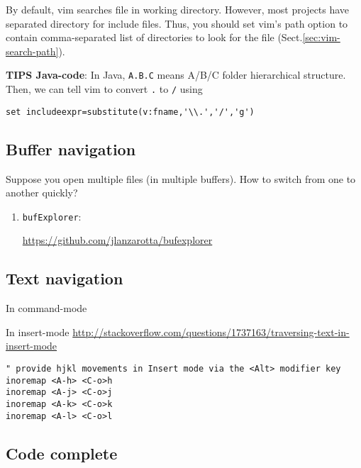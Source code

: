 By default, vim searches file in working directory. 
However, most projects have separated directory for include files. Thus, you
should set vim's path option to contain comma-separated list of directories to
look for the file (Sect.\ref{sec:vim-search-path}).

{\bf TIPS Java-code}: In Java, \verb!A.B.C! means A/B/C folder hierarchical
structure. Then, we can tell vim to convert \verb!.! to \verb!/! using
\begin{verbatim}
set includeexpr=substitute(v:fname,'\\.','/','g')
\end{verbatim}

\subsection{Buffer navigation}

Suppose you open multiple files (in multiple buffers). How to switch from one to
another quickly?

\begin{enumerate}
  \item \verb!bufExplorer!:
  
  \url{https://github.com/jlanzarotta/bufexplorer}
  
  
  
\end{enumerate}

\subsection{Text navigation}

In command-mode



In insert-mode
\url{http://stackoverflow.com/questions/1737163/traversing-text-in-insert-mode}

\begin{verbatim}
" provide hjkl movements in Insert mode via the <Alt> modifier key
inoremap <A-h> <C-o>h
inoremap <A-j> <C-o>j
inoremap <A-k> <C-o>k
inoremap <A-l> <C-o>l
\end{verbatim}


\subsection{Code complete}

